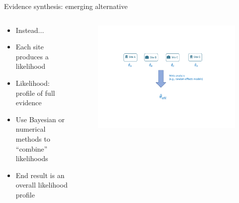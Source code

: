 \documentclass[aspectratio=169,xcolor=dvipsnames]{beamer}					%
\begin{document}
{
\begin{frame}{Evidence synthesis: emerging alternative}
\begin{columns}
\begin{column}{0.45\textwidth}
\begin{itemize}
    \item Instead...
    \item Each site produces a likelihood
    \item Likelihood: profile of full evidence
    \item Use Bayesian or numerical methods to ``combine'' likelihoods
    \item End result is an overall likelihood profile
\end{itemize}

\end{column}
\begin{column}{0.6\textwidth}

\begin{figure}
    \centering
    \hspace*{-0.23in}
    \includegraphics[trim = 0.5in 1in 0.5in 1.2in, clip, width=1.2\textwidth, page=2]{figures/Legend_hightlight_method_graphs.pdf}
\end{figure}
\end{column}

\end{columns}

\end{frame}
}
\end{document}
